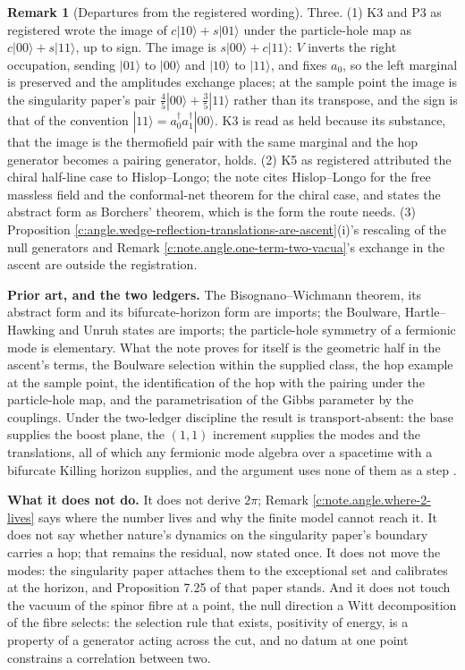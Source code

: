 \documentclass[11pt]{article}
\theoremstyle{definition}
\newtheorem{remark}[theorem]{Remark}
\theoremstyle{plain}
\providecommand{\ket}{}\renewcommand{\ket}[1]{|#1\rangle}
\begin{document}
\begin{remark}[Departures from the registered wording]\label{c:note.angle.departures-registered-wording}
Three. (1) K3 and P3 as registered wrote the image of $c\ket{10} + s\ket{01}$ under the particle-hole map as $c\ket{00} + s\ket{11}$, up to sign. The image is $s\ket{00} + c\ket{11}$: $V$ inverts the right occupation, sending $\ket{01}$ to $\ket{00}$ and $\ket{10}$ to $\ket{11}$, and fixes $a_{0}$, so the left marginal is preserved and the amplitudes exchange places; at the sample point the image is the singularity paper's pair $\tfrac45\ket{00} + \tfrac35\ket{11}$ rather than its transpose, and the sign is that of the convention $\ket{11} = a^{\dagger}_{0}a^{\dagger}_{1}\ket{00}$. K3 is read as held because its substance, that the image is the thermofield pair with the same marginal and the hop generator becomes a pairing generator, holds. (2) K5 as registered attributed the chiral half-line case to Hislop--Longo; the note cites Hislop--Longo for the free massless field and the conformal-net theorem for the chiral case, and states the abstract form as Borchers' theorem, which is the form the route needs. (3) Proposition \ref{c:angle.wedge-reflection-translations-are-ascent}(i)'s rescaling of the null generators and Remark \ref{c:note.angle.one-term-two-vacua}'s exchange in the ascent are outside the registration.
\end{remark}

\label{c:note.angle.setting-what-does-singularity-paper-what-3}
\textbf{Prior art, and the two ledgers.} The Bisognano--Wichmann theorem, its abstract form and its bifurcate-horizon form are imports; the Boulware, Hartle--Hawking and Unruh states are imports; the particle-hole symmetry of a fermionic mode is elementary. What the note proves for itself is the geometric half in the ascent's terms, the Boulware selection within the supplied class, the hop example at the sample point, the identification of the hop with the pairing under the particle-hole map, and the parametrisation of the Gibbs parameter by the couplings. Under the two-ledger discipline the result is transport-absent: the base supplies the boost plane, the $(1,1)$ increment supplies the modes and the translations, all of which any fermionic mode algebra over a spacetime with a bifurcate Killing horizon supplies, and the argument uses none of them as a step \cite{ButlerT17}.

\label{c:note.angle.setting-what-does-singularity-paper-what-4}
\textbf{What it does not do.} It does not derive $2\pi$; Remark \ref{c:note.angle.where-2-lives} says where the number lives and why the finite model cannot reach it. It does not say whether nature's dynamics on the singularity paper's boundary carries a hop; that remains the residual, now stated once. It does not move the modes: the singularity paper attaches them to the exceptional set and calibrates at the horizon, and Proposition 7.25 of that paper stands. And it does not touch the vacuum of the spinor fibre at a point, the null direction a Witt decomposition of the fibre selects: the selection rule that exists, positivity of energy, is a property of a generator acting across the cut, and no datum at one point constrains a correlation between two.
\end{document}
